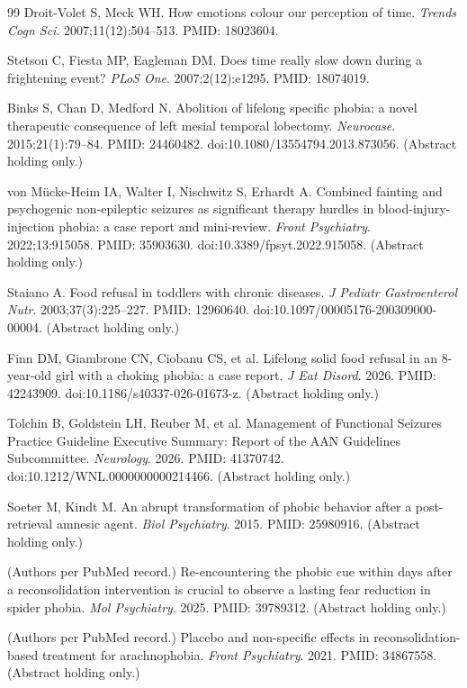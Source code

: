 \documentclass[9pt,twocolumn]{article}
\begin{document}
\begin{thebibliography}{99}
Droit-Volet S, Meck WH. How emotions colour our perception of time. \emph{Trends Cogn Sci}. 2007;11(12):504--513. PMID: 18023604.

Stetson C, Fiesta MP, Eagleman DM. Does time really slow down during a frightening event? \emph{PLoS One}. 2007;2(12):e1295. PMID: 18074019.

Binks S, Chan D, Medford N. Abolition of lifelong specific phobia: a novel therapeutic consequence of left mesial temporal lobectomy. \emph{Neurocase}. 2015;21(1):79--84. PMID: 24460482. doi:10.1080/13554794.2013.873056. (Abstract holding only.)

von M\"ucke-Heim IA, Walter I, Nischwitz S, Erhardt A. Combined fainting and psychogenic non-epileptic seizures as significant therapy hurdles in blood-injury-injection phobia: a case report and mini-review. \emph{Front Psychiatry}. 2022;13:915058. PMID: 35903630. doi:10.3389/fpsyt.2022.915058. (Abstract holding only.)

Staiano A. Food refusal in toddlers with chronic diseases. \emph{J Pediatr Gastroenterol Nutr}. 2003;37(3):225--227. PMID: 12960640. doi:10.1097/00005176-200309000-00004. (Abstract holding only.)

Finn DM, Giambrone CN, Ciobanu CS, et al. Lifelong solid food refusal in an 8-year-old girl with a choking phobia: a case report. \emph{J Eat Disord}. 2026. PMID: 42243909. doi:10.1186/s40337-026-01673-z. (Abstract holding only.)

Tolchin B, Goldstein LH, Reuber M, et al. Management of Functional Seizures Practice Guideline Executive Summary: Report of the AAN Guidelines Subcommittee. \emph{Neurology}. 2026. PMID: 41370742. doi:10.1212/WNL.0000000000214466. (Abstract holding only.)

Soeter M, Kindt M. An abrupt transformation of phobic behavior after a post-retrieval amnesic agent. \emph{Biol Psychiatry}. 2015. PMID: 25980916. (Abstract holding only.)

(Authors per PubMed record.) Re-encountering the phobic cue within days after a reconsolidation intervention is crucial to observe a lasting fear reduction in spider phobia. \emph{Mol Psychiatry}. 2025. PMID: 39789312. (Abstract holding only.)

(Authors per PubMed record.) Placebo and non-specific effects in reconsolidation-based treatment for arachnophobia. \emph{Front Psychiatry}. 2021. PMID: 34867558. (Abstract holding only.)


\end{thebibliography}
\end{document}
